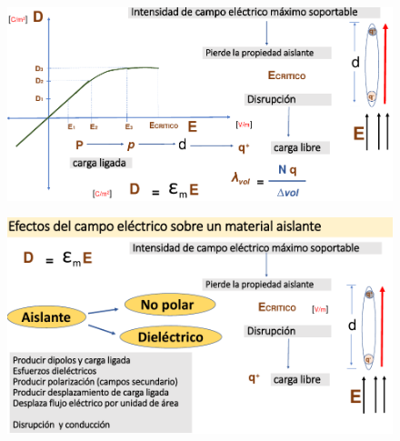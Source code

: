 \documentclass[12pt,letterpaper]{book}
\begin{document}
\begin{figure}[H]
\centering
\includegraphics[width=1\linewidth]{figures/dis1.png}
\caption{}
\label{}
\end{figure}
\vspace{0.2cm}

\begin{figure}[H]
\centering
\includegraphics[width=1\linewidth]{figures/dis2.png}
\caption{}
\label{}
\end{figure}
\vspace{0.2cm}




\end{document}
